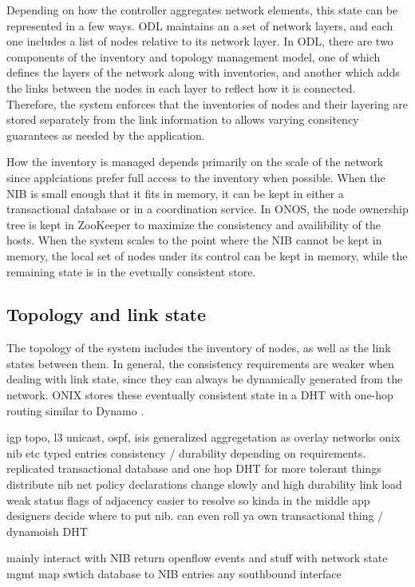 \documentclass[letterpaper,twocolumn,10pt]{article}
\begin{document}
Depending on how the controller aggregates network elements, this state can be represented in a few ways. ODL maintains an a set of network layers, and each one includes a list of nodes relative to its network layer. In ODL, there are two components of the inventory and topology management model, one of which defines the layers of the network along with inventories, and another which adds the links between the nodes in each layer to reflect how it is connected.
Therefore, the system enforces that the inventories of nodes and their layering are stored separately from the link information to allows varying consitency guarantees as needed by the application.

How the inventory is managed depends primarily on the scale of the network since applciations prefer full access to the inventory when possible. When the NIB is small enough that it fits in memory, it can be kept in either a transactional database or in a coordination service. In ONOS, the node ownership tree is kept in ZooKeeper to maximize the consistency and availibility of the hosts. When the system scales to the point where the NIB cannot be kept in memory, the local set of nodes under its control can be kept in memory, while the remaining state is in the evetually consistent store.

\subsection*{Topology and link state}

The topology of the system includes the inventory of nodes, as well as the link states between them. In general, the consistency requirements are weaker when dealing with link state, since they can always be dynamically generated from the network. ONIX stores these eventually consistent state in a DHT with one-hop routing similar to Dynamo \cite{decandia2007dynamo}.

igp topo, l3 unicast, ospf, isis
generalized aggregetation as overlay networks
onix nib etc
typed entries
consistency / durability depending on requirements. replicated transactional database and one hop DHT for more tolerant things
distribute nib
    net policy declarations change slowly and high durability
    link load weak
    status flags of adjacency easier to resolve so kinda in the middle
    app designers decide where to put nib. 
        can even roll ya own
    transactional thing / dynamoish DHT 
    
    mainly interact with NIB
    return openflow events and stuff with network state mgmt
        map swtich database to NIB entries
        any southbound interface
\end{document}
